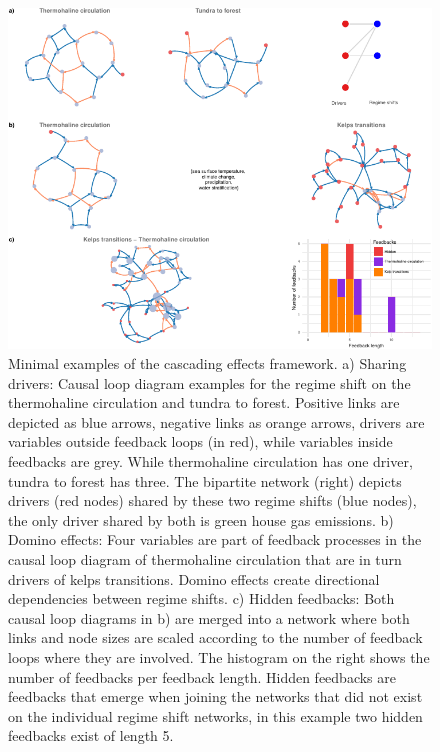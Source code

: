 \documentclass[9pt,]{article}
\begin{document}
\begin{figure}

{\centering \includegraphics{170417_draft_files/figure-latex/Fig2-1} 

}

\caption{Minimal examples of the cascading effects framework. a) Sharing drivers: Causal loop diagram examples for the regime shift on the thermohaline circulation and tundra to forest. Positive links are depicted as blue arrows, negative links as orange arrows, drivers are variables outside feedback loops (in red), while variables inside feedbacks are grey. While thermohaline circulation has one driver, tundra to forest has three. The bipartite network (right) depicts drivers (red nodes) shared by these two regime shifts (blue nodes), the only driver shared by both is green house gas emissions. b) Domino effects: Four variables are part of feedback processes in the causal loop diagram of thermohaline circulation that are in turn drivers of kelps transitions. Domino effects create directional dependencies between regime shifts. c) Hidden feedbacks: Both causal loop diagrams in b) are merged into a network where both links and node sizes are scaled according to the number of feedback loops where they are involved. The histogram on the right shows the number of feedbacks per feedback length. Hidden feedbacks are feedbacks that emerge when joining the networks that did not exist on the individual regime shift networks, in this example two hidden feedbacks exist of length 5.}\label{fig:Fig2}
\end{figure}
\end{document}
